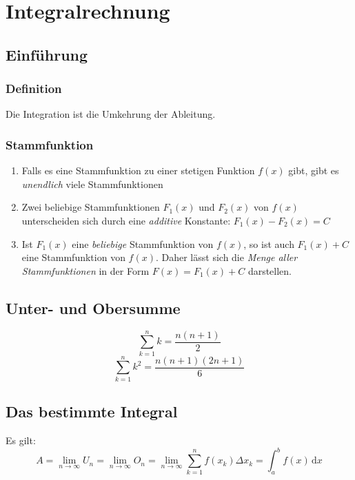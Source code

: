 \documentclass[a4paper,DIV10,12pt,headsepline,smallheadings,halfparskip-]{scrreprt}
\begin{document}
	\chapter{Integralrechnung}
	\section{Einführung} %
	\label{sec:einführung}
	
	\subsection{Definition} %
	\label{sub:definition}
	Die Integration ist die Umkehrung der Ableitung.
	\subsection{Stammfunktion} %
	\begin{enumerate}
		\item Falls es eine Stammfunktion zu einer stetigen Funktion \(f(x)\) gibt, gibt es \emph{unendlich} viele Stammfunktionen
		\item Zwei beliebige Stammfunktionen \(F_1 (x)\) und \(F_2 (x)\) von \(f(x)\) unterscheiden sich durch eine \emph{additive} Konstante: \(F_1 (x) - F_2 (x) = C\)
		\item Ist \(F_1 (x)\) eine \emph{beliebige} Stammfunktion von \(f (x)\), so ist auch \(F_1 (x) + C\) eine Stammfunktion von \(f (x)\). Daher lässt sich die \emph{Menge aller Stammfunktionen} in der Form \(F(x) = F_1 (x) + C \) darstellen.
	\end{enumerate}
	
	\section{Unter- und Obersumme}
	\[ \sum_{k=1}^{n} k = \frac{n(n+1)}{2} \]
	\[ \sum_{k=1}^{n} k^2 = \frac{n(n+1)(2n+1)}{6} \]

	\section{Das bestimmte Integral} %
	\label{sub:das_bestimmte_integral}
	Es gilt:\newline
	\[A = \lim\limits_{n \rightarrow \infty}U_n = \lim\limits_{n \rightarrow \infty}O_n = \lim\limits_{n \rightarrow \infty}\sum_{k=1}^{n} f(x_k) \Delta x_k = \int_a^b f(x)\,\mathrm{d}x \]
\end{document}
